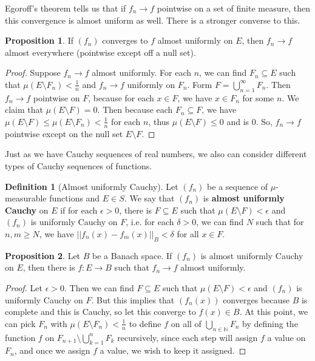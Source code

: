 \documentclass[11pt, oneside]{amsart}   	%
\theoremstyle{definition}
\newtheorem{definition}{Definition}[section]
\newtheorem{prop}{Proposition}[section]
\begin{document}
	Egoroff's theorem tells us that if $f_n\rightarrow f$ pointwise on a set of finite measure, then this convergence is 
	almost uniform as well. There is a stronger converse to this.
	
	\begin{prop}
		If $(f_n)$ converges to $f$ almost uniformly on $E$, then $f_n\rightarrow f$ almost everywhere (pointwise except 
		off a null set). 
	\end{prop}
	
	\begin{proof}
		Suppose $f_n\rightarrow f$ almost uniformly. For each $n$, we can find $F_n\subseteq E$ such that $\mu(E
		\setminus F_n) < \frac{1}{n}$ and $f_n\rightarrow f$ uniformly on $F_n$. Form $F = \bigcup_{n = 1}^\infty F_n$. 
		Then $f_n\rightarrow f$ pointwise on $F$, because for each $x\in F$, we have $x\in F_n$ for some $n$. We 
		claim that $\mu(E\setminus F) = 0$. Then because each $F_n\subseteq F$, we have $\mu(E\setminus F)
		\leq\mu(E\setminus F_n) < \frac{1}{n}$ for each $n$, thus $\mu(E\setminus F)\leq 0$ and is 0. So, $f_n\rightarrow 
		f$ pointwise except on the null set $E\setminus F$. 
	\end{proof}
	
	Just as we have Cauchy sequences of real numbers, we also can consider different types of Cauchy sequences of 
	functions.
	
	\begin{definition}[Almost uniformly Cauchy]
		Let $(f_n)$ be a sequence of $\mu$-measurable functions and $E\in S$. We say that $(f_n)$ is \textbf{almost 
		uniformly Cauchy} on $E$ if for each $\epsilon > 0$, there is $F\subseteq E$ such that $\mu(E\setminus F) < 
		\epsilon$ and $(f_n)$ is uniformly Cauchy on $F$, i.e. for each $\delta > 0$, we can find $N$ such that for 
		$n, m\geq N$, we have $||f_n(x) - f_m(x)||_B < \delta$ for all $x\in F$. 
	\end{definition}
	
	\begin{prop}
		Let $B$ be a Banach space. If $(f_n)$ is almost uniformly Cauchy on $E$, then there is $f : E\rightarrow B$ 
		such that $f_n\rightarrow f$ almost uniformly.
	\end{prop}
	
	\begin{proof}
		Let $\epsilon > 0$. Then we can find $F\subseteq E$ such that $\mu(E\setminus F) < \epsilon$ and $(f_n)$ 
		is uniformly Cauchy on $F$. But this implies that $(f_n(x))$ converges because $B$ is complete and this is 
		Cauchy, so let this converge to $f(x)\in B$. At this point, we can pick $F_n$ with $\mu(E\setminus F_n) < \frac{1}{n}$ 
		to define $f$ on all of $\bigcup_{n\in\mathbb N} F_n$ by defining the function $f$ on $F_{n + 1}\setminus \bigcup_{k 
		= 1}^nF_k$ recursively, since each step will assign $f$ a value on $F_n$, and once we assign $f$ a value, we wish 
		to keep it assigned.
	\end{proof}
	
\end{document}
